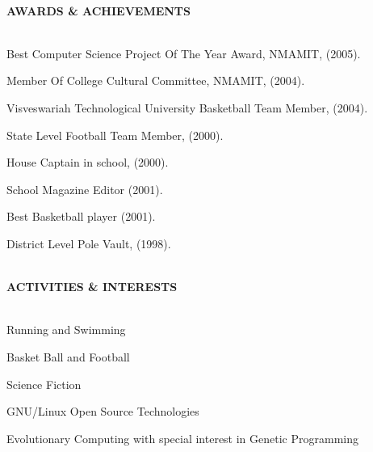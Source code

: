 \documentclass[10pt]{article}
\newcommand{\lineunder}{\vspace*{-10pt} \\ \hspace*{-18pt} \hrulefill \vspace{2pt}\\}
\newcommand{\header}[1]{{\hspace*{-15pt}\vspace*{-0pt}\\ \uppercase{\textbf {#1}}}  \lineunder}
\newenvironment{achievements}{
        \vspace{-0pt}
        \begin{list}
        {}
        {\topsep 0pt \itemsep -3pt}
}
{
        \end{list}
}
\begin{document}
\header{Awards \& Achievements} 
\begin{achievements}
\item Best Computer Science Project Of The Year Award, NMAMIT, (2005). \\
\item Member Of College Cultural Committee, NMAMIT, (2004). \\
\item Visveswariah Technological University Basketball Team Member, (2004).\\
\item State Level Football Team Member, (2000).\\
\item House Captain in school, (2000).\\
\item School Magazine Editor (2001).\\
\item Best Basketball player (2001). \\
\item District Level Pole Vault, (1998).\\
\end{achievements}

\header{Activities \& Interests} 
\begin{achievements}
\item Running and Swimming \\
\item Basket Ball and Football \\
\item Science Fiction \\
\item GNU/Linux Open Source Technologies \\
\item Evolutionary Computing with special interest in Genetic Programming \\
\end{achievements}
\end{document}
